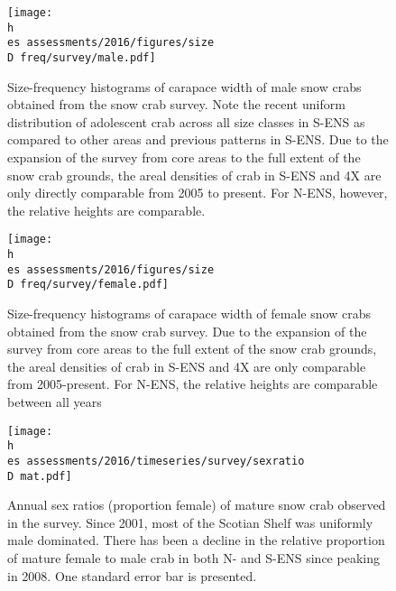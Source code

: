 \documentclass[11pt]{article}
\newcommand{\D}{.}
\newcommand{\h}{/home/hubleyb/}
\newcommand{\es}{bio.data/bio.snowcrab/}
\begin{document}

\begin{figure}
\centering
\texttt{[image: \\h \\es assessments/2016/figures/size\\D freq/survey/male.pdf]}\\ 
\caption{Size-frequency histograms of carapace width of male snow crabs obtained from the snow crab survey. Note the recent uniform distribution of adolescent crab across all size classes in S-ENS as compared to other areas and previous patterns in S-ENS. Due to the expansion of the survey from core areas to the full extent of the snow crab grounds, the areal densities of crab in S-ENS and 4X are only directly comparable from 2005 to present. For N-ENS, however, the relative heights are comparable. }
\end{figure}
\clearpage

\begin{figure}
\centering
\texttt{[image: \\h \\es assessments/2016/figures/size\\D freq/survey/female.pdf]}\\ 
\caption{ Size-frequency histograms of carapace width of female snow crabs obtained from the snow crab survey. Due to the expansion of the survey from core areas to the full extent of the snow crab grounds, the areal densities of crab in S-ENS and 4X are only comparable from 2005-present. For N-ENS, the relative heights are comparable between all years}
\end{figure}
\clearpage

\begin{figure}
\centering
\texttt{[image: \\h \\es assessments/2016/timeseries/survey/sexratio\\D mat.pdf]}\\ 
\caption{ Annual sex ratios (proportion female) of mature snow crab observed in the survey. Since 2001, most of the Scotian Shelf was uniformly male dominated. There has been a decline in the relative proportion of mature female to male crab in both N- and S-ENS since peaking in 2008. One standard error bar is presented.}
\end{figure}
\clearpage
\end{document}
